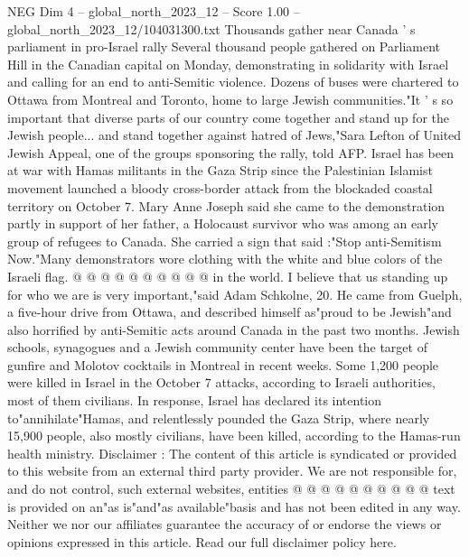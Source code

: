 \begin{textsample}{NEG Dim 4 – global\_north\_2023\_12 – Score 1.00 – global\_north\_2023\_12/104031300.txt}  \label{ex:f4_neg_149}
Thousands gather near Canada ' s parliament in pro-Israel rally Several thousand people gathered on Parliament Hill in the Canadian capital on Monday, demonstrating in solidarity with Israel and calling for an end to anti-Semitic violence.
Dozens of buses were chartered to Ottawa from Montreal and Toronto, home to large Jewish communities."It ' s so important that diverse parts of our country come together and stand up for the Jewish people... and stand together against hatred of Jews,"Sara Lefton of United Jewish Appeal, one of the groups sponsoring the rally, told AFP.
Israel has been at war with Hamas militants in the Gaza Strip since the Palestinian Islamist movement launched a bloody cross-border attack from the blockaded coastal territory on October 7.
Mary Anne Joseph said she came to the demonstration partly in support of her father, a Holocaust survivor who was among an early group of refugees to Canada.
She carried a sign that said :"Stop anti-Semitism Now."Many demonstrators wore clothing with the white and blue colors of the Israeli flag. @ @ @ @ @ @ @ @ @ @ in the world.
I believe that us standing up for who we are is very important,"said Adam Schkolne, 20.
He came from Guelph, a five-hour drive from Ottawa, and described himself as"proud to be Jewish"and also horrified by anti-Semitic acts around Canada in the past two months.
Jewish schools, synagogues and a Jewish community center have been the target of gunfire and Molotov cocktails in Montreal in recent weeks.
Some 1,200 people were killed in Israel in the October 7 attacks, according to Israeli authorities, most of them civilians.
In response, Israel has declared its intention to"annihilate"Hamas, and relentlessly pounded the Gaza Strip, where nearly 15,900 people, also mostly civilians, have been killed, according to the Hamas-run health ministry.
Disclaimer : The content of this article is syndicated or provided to this website from an external third party provider.
We are not responsible for, and do not control, such external websites, entities @ @ @ @ @ @ @ @ @ @ text is provided on an"as is"and"as available"basis and has not been edited in any way.
Neither we nor our affiliates guarantee the accuracy of or endorse the views or opinions expressed in this article.
Read our full disclaimer policy here.

\end{textsample}

